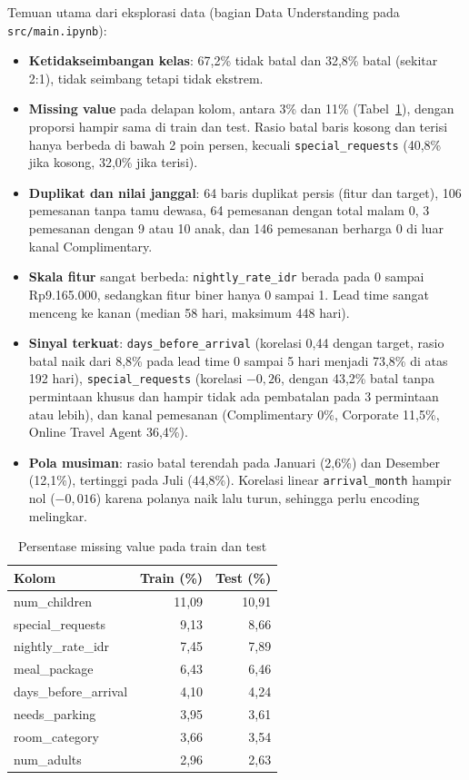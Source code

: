 Temuan utama dari eksplorasi data (bagian Data Understanding pada \texttt{src/main.ipynb}):
\begin{itemize}
  \item \textbf{Ketidakseimbangan kelas}: 67,2\% tidak batal dan 32,8\% batal (sekitar 2:1), tidak seimbang tetapi tidak ekstrem.
  \item \textbf{Missing value} pada delapan kolom, antara 3\% dan 11\% (Tabel~\ref{tab:missing}), dengan proporsi hampir sama di train dan test. Rasio batal baris kosong dan terisi hanya berbeda di bawah 2 poin persen, kecuali \texttt{special\_requests} (40,8\% jika kosong, 32,0\% jika terisi).
  \item \textbf{Duplikat dan nilai janggal}: 64 baris duplikat persis (fitur dan target), 106 pemesanan tanpa tamu dewasa, 64 pemesanan dengan total malam 0, 3 pemesanan dengan 9 atau 10 anak, dan 146 pemesanan berharga 0 di luar kanal Complimentary.
  \item \textbf{Skala fitur} sangat berbeda: \texttt{nightly\_rate\_idr} berada pada 0 sampai Rp9.165.000, sedangkan fitur biner hanya 0 sampai 1. Lead time sangat menceng ke kanan (median 58 hari, maksimum 448 hari).
  \item \textbf{Sinyal terkuat}: \texttt{days\_before\_arrival} (korelasi 0,44 dengan target, rasio batal naik dari 8,8\% pada lead time 0 sampai 5 hari menjadi 73,8\% di atas 192 hari), \texttt{special\_requests} (korelasi $-0{,}26$, dengan 43,2\% batal tanpa permintaan khusus dan hampir tidak ada pembatalan pada 3 permintaan atau lebih), dan kanal pemesanan (Complimentary 0\%, Corporate 11,5\%, Online Travel Agent 36,4\%).
  \item \textbf{Pola musiman}: rasio batal terendah pada Januari (2,6\%) dan Desember (12,1\%), tertinggi pada Juli (44,8\%). Korelasi linear \texttt{arrival\_month} hampir nol ($-0{,}016$) karena polanya naik lalu turun, sehingga perlu encoding melingkar.
\end{itemize}

\begin{table}[H]
\centering
\caption{Persentase missing value pada train dan test}
\label{tab:missing}
\begin{tabular}{lrr}
\toprule
Kolom & Train (\%) & Test (\%) \\
\midrule
num\_children & 11,09 & 10,91 \\
special\_requests & 9,13 & 8,66 \\
nightly\_rate\_idr & 7,45 & 7,89 \\
meal\_package & 6,43 & 6,46 \\
days\_before\_arrival & 4,10 & 4,24 \\
needs\_parking & 3,95 & 3,61 \\
room\_category & 3,66 & 3,54 \\
num\_adults & 2,96 & 2,63 \\
\bottomrule
\end{tabular}
\end{table}

